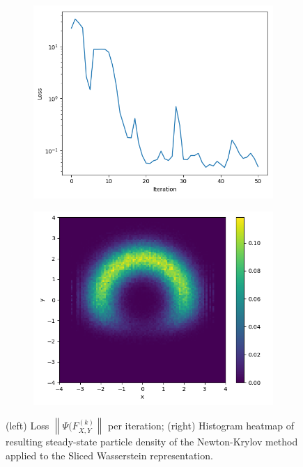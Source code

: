 \documentclass{article}
\newcommand{\norm}[1]{\left\lVert#1\right\rVert}
\begin{document}
\begin{figure}[h]
    \centering
    \begin{subfigure}[b]{0.5\textwidth}
        \centering
        \includegraphics[width=\textwidth]{figures/SWLoss.png}
    \end{subfigure}%
    \begin{subfigure}[b]{0.5\textwidth}
        \centering
        \includegraphics[width=\textwidth]{figures/SW Heatmap.png}
    \end{subfigure}
    \caption{(left) Loss $\norm{\Psi(F_{X,Y}^{(k)}}$ per iteration; (right) Histogram heatmap of resulting steady-state particle density of the Newton-Krylov method applied to the Sliced Wasserstein representation.}
    \label{fig:nk_sw2}
\end{figure}
\end{document}
